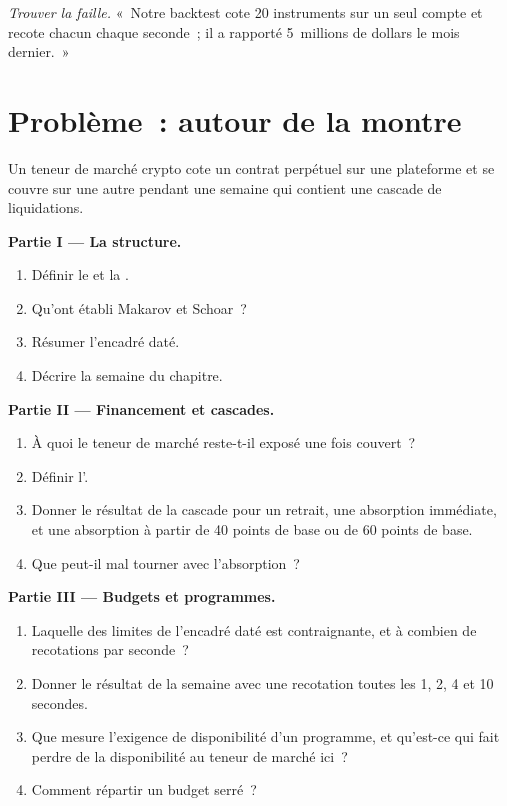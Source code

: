\begin{exercise}[$\star\star\star$]\label{exo:hf:crypto-high-frequency-trading-on-centralised-venues:8}
\emph{Trouver la faille.} «~Notre backtest cote 20 instruments sur un seul compte et recote chacun chaque seconde~; il a rapporté 5~millions de dollars le mois dernier.~»
\end{exercise}

\section{Problème~: autour de la montre}

\begin{problem}\label{pb:hf:crypto-high-frequency-trading-on-centralised-venues:1}
Un teneur de marché crypto cote un contrat perpétuel sur une plateforme et se couvre sur une autre pendant une semaine qui contient une cascade de liquidations.

\medskip\noindent\textbf{Partie I --- La structure.}
\begin{enumerate}
\item Définir le  et la .
\item Qu'ont établi Makarov et Schoar~?
\item Résumer l'encadré daté.
\item Décrire la semaine du chapitre.
\end{enumerate}

\medskip\noindent\textbf{Partie II --- Financement et cascades.}
\begin{enumerate}[resume]
\item À quoi le teneur de marché reste-t-il exposé une fois couvert~?
\item Définir l'.
\item Donner le résultat de la cascade pour un retrait, une absorption immédiate, et une absorption à partir de 40 points de base ou de 60 points de base.
\item Que peut-il mal tourner avec l'absorption~?
\end{enumerate}

\medskip\noindent\textbf{Partie III --- Budgets et programmes.}
\begin{enumerate}[resume]
\item Laquelle des limites de l'encadré daté est contraignante, et à combien de recotations par seconde~?
\item Donner le résultat de la semaine avec une recotation toutes les 1, 2, 4 et 10 secondes.
\item Que mesure l'exigence de disponibilité d'un programme, et qu'est-ce qui fait perdre de la disponibilité au teneur de marché ici~?
\item Comment répartir un budget serré~?
\end{enumerate}


\end{problem}
